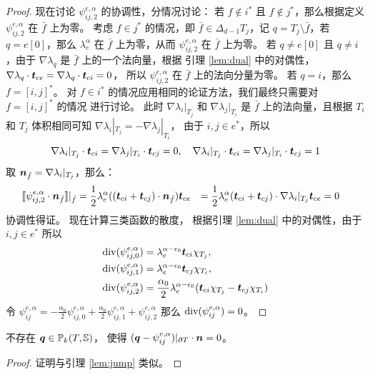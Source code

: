 \documentclass[letterpaper,12pt]{article}
\begin{document}
\begin{proof}
现在讨论 $\psi_{ij, 2}^{e, \alpha}$ 的协调性，分情况讨论：
若 $f \not \in i^*$ 且 $ f \not \in j^*$，那么根据定义 $\psi_{ij, 2}^{e, \alpha}$ 在
$\bar{f}$ 上为零。
考虑 $f \in j^*$ 的情况，即 $\bar{f} \in \Delta_{d-1} T_j$，记 $q = T_j\setminus
\bar{f}$，若 $q = e[0]$，那么 $\lambda_e^{\alpha}$ 在 $\bar{f}$ 上为零，从而
$\psi_{ij, 2}^{e, \alpha}$ 在 $\bar{f}$ 上为零。
若 $q \not = e[0]$ 且 $q \not = i$，由于 $\nabla \lambda_q$ 是 $\bar{f}$
上的一个法向量，根据 引理 \ref{lem:dual} 中的对偶性，
$\nabla \lambda_q \cdot \boldsymbol{t}_{ce} = \nabla \lambda_q \cdot \boldsymbol{t}_{ci} = 0$，
所以 $\psi_{ij, 2}^{e, \alpha}$ 在 $\bar{f}$ 上的法向分量为零。
若 $q = i$，那么 $f = [i, j]^*$。
对 $f \in i^*$ 的情况应用相同的论证方法，我们最终只需要对 $f = [i, j]^*$ 的情况
进行讨论。
此时 $\nabla \lambda_i|_{T_j}$ 和 $\nabla \lambda_j|_{T_i}$ 是 $\bar{f}$
上的法向量，且根据 $T_i$ 和 $T_j$ 体积相同可知 $\nabla \lambda_i|_{T_j} =
-\nabla \lambda_j|_{T_i}$，
由于 $ i, j \in e^*$，所以 
$$
\nabla \lambda_i|_{T_j} \cdot \boldsymbol{t}_{ci} = \nabla \lambda_j|_{T_i} \cdot
\boldsymbol{t}_{cj} = 0, \quad \nabla\lambda_i|_{T_j} \cdot \boldsymbol{t}_{ci} = \nabla \lambda_j|_{T_i}
\cdot \boldsymbol{t}_{cj} = 1
$$
取 $\boldsymbol{n}_{\bar{f}} = \nabla \lambda_i|_{T_j}$，那么：
$$
\begin{aligned}
    [\![\psi_{ij, 2}^{e, \alpha}\cdot \bsn_{\bar{f}}]\!]|_{\bar{f}} & = \frac{1}{2}\lambda_e^{\alpha}
    ((\bst_{ci} + \bst_{cj}) \cdot \bsn_{\bar{f}})\bst_{ce}
    & = \frac{1}{2}\lambda_e^{\alpha} (\bst_{ci} + \bst_{cj}) \cdot
    \nabla\lambda_i|_{T_j} \bst_{ce}
    & = 0
\end{aligned}
$$
协调性得证。
现在计算三类函数的散度，
根据引理 \ref{lem:dual} 中的对偶性，由于 $i, j \in e^*$ 所以 
$$
\begin{aligned}
    \operatorname{div}(\psi_{ij, 0}^{e, \alpha}) & = \lambda_e^{\alpha - \epsilon_0} \boldsymbol{t}_{ci} \chi_{T_j},\\
    \operatorname{div}(\psi_{ij, 1}^{e, \alpha}) & = \lambda_e^{\alpha - \epsilon_0} \boldsymbol{t}_{cj} \chi_{T_i},\\
    \operatorname{div}(\psi_{ij, 2}^{e, \alpha}) & = \frac{\alpha_0}{2} \lambda_e^{\alpha -
    \epsilon_0} (\boldsymbol{t}_{ci} \chi_{T_j} - \boldsymbol{t}_{cj} \chi_{T_i}) 
\end{aligned}
$$
令
$
\psi_{ij}^{e, \alpha} = -\frac{\alpha_0}{2}\psi_{ij, 0}^{e, \alpha} +
\frac{\alpha_0}{2}\psi_{ij, 1}^{e, \alpha} + \psi_{ij, 2}^{e, \alpha}
$
那么 $\operatorname{div}(\psi_{ij}^{e, \alpha}) = 0$。
\end{proof}

\begin{lemma}
    \label{lem:jump}
    不存在 $\boldsymbol{q} \in \mathbb{P}_k(T, \mathbb{S})$，
    使得 $(\boldsymbol{q} - \psi_{ij}^{e, \alpha})|_{\partial T}\cdot \boldsymbol{n} = 0$。
\end{lemma}
\begin{proof}
    证明与引理 \ref{lem:jump} 类似。
\end{proof}
\end{document}
